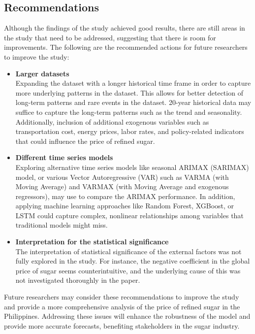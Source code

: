 \documentclass[11pt]{article}
\begin{document}
\subsection{Recommendations}
Although the findings of the study achieved good results, there are still areas in the study that need to be addressed, suggesting that there is room for improvements. The following are the recommended actions for future researchers to improve the study:

\begin{itemize}
    \item \textbf{Larger datasets}\\
    Expanding the dataset with a longer historical time frame in order to capture more underlying patterns in the dataset. This allows for better detection of long-term patterns and rare events in the dataset. 20-year historical data may suffice to capture the long-term patterns such as the trend and seasonality. Additionally, inclusion of additional exogenous variables such as transportation cost, energy prices, labor rates, and policy-related indicators that could influence the price of refined sugar. 

    \item \textbf{Different time series models}\\
    Exploring alternative time series models like seasonal ARIMAX (SARIMAX) model, or various Vector Autoregressive (VAR) such as VARMA (with Moving Average) and VARMAX (with Moving Average and exogenous regressors), may use to compare the ARIMAX performance. In addition, applying machine learning approaches like Random Forest, XGBoost, or LSTM could capture complex, nonlinear relationships among variables that traditional models might miss. 


    \item \textbf{Interpretation for the statistical significance}\\
    The interpretation of statistical significance of the external factors was not fully explored in the study. For instance, the negative coefficient in the global price of sugar seems counterintuitive, and the underlying cause of this was not investigated thoroughly in the paper. 
\end{itemize}

Future researchers may consider these recommendations to improve the study and provide a more comprehensive analysis of the price of refined sugar in the Philippines. Addressing these issues will enhance the robustness of the model and provide more accurate forecasts, benefiting stakeholders in the sugar industry.
\end{document}
